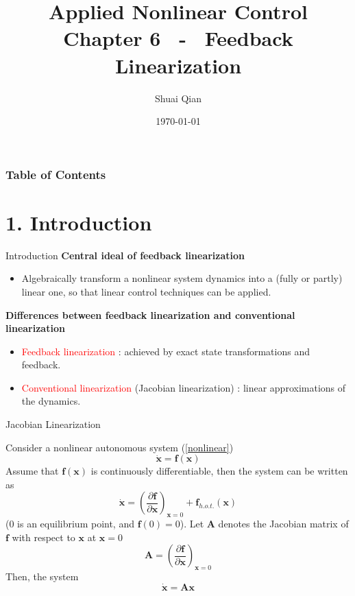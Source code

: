 \documentclass{beamer}
\title{Applied Nonlinear Control \\
        \large Chapter 6 ~-~ Feedback Linearization}
\author{\large Shuai Qian}
\date{\today}
\institute{School of Automation \\
        Nanjing University of Science and Technology}
\renewcommand{\vec}[1]{\ensuremath{\boldsymbol{#1}}} %
\begin{document}
  \maketitle

  \begin{frame}
  \addtocounter{framenumber}{-2}
  \frametitle{Table of Contents}
  \thispagestyle{empty}
  \tableofcontents
  \end{frame}


  \section{1. Introduction}

  \begin{frame}{Introduction}
    \textbf{Central ideal of feedback linearization}
    \begin{itemize}
      \item Algebraically transform a nonlinear system dynamics into a (fully or partly) linear one, so that linear control techniques can be applied.
    \end{itemize}

    \textbf{Differences between feedback linearization and conventional linearization}
    \begin{itemize}
      \item \textcolor{red}{Feedback linearization} : achieved by exact state transformations and feedback.
      \item \textcolor{red}{Conventional linearization} (Jacobian linearization) : linear approximations of the dynamics.
    \end{itemize}
   \end{frame}


   \begin{frame}{Jacobian Linearization}

    Consider a nonlinear autonomous system (\ref{nonlinear})
    \begin{equation}\label{nonlinear}
      \dot{\vec{x}} = \vec{f(x)}
    \end{equation}
    Assume that $\vec{f(x)}$ is continuously differentiable,
    then the system can be written as
    $$
    \dot{\vec{x}} = (\frac{\partial \vec{f}}{\partial \vec{x}})_{\vec{x}=0} + \vec{f}_{h.o.t.}(\vec{x})
    $$
    (0 is an equilibrium point, and $\vec{f}(0) = 0$).
    Let $\vec{A}$ denotes the Jacobian matrix of $\vec{f}$ with respect to $\vec{x}$ at $\vec{x}=0$
    $$
    \vec{A} = (\frac{\partial \vec{f}}{\partial \vec{x}})_{\vec{x}=0}
    $$
    Then, the system
    $$
    \dot{\vec{x}} = \vec{Ax}
    $$
   \end{frame}
\end{document}

